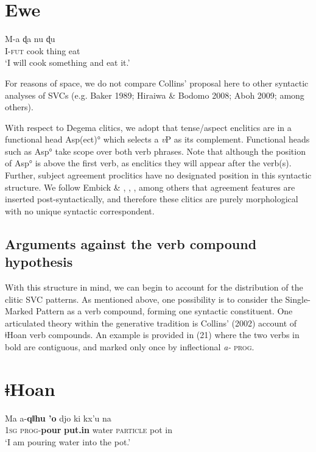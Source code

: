 \chapter[Ewe]{Ewe}
\label{bkm:Ref375319560}\gll M-a  ɖa    nu    ɖu\\
     I-\textsc{fut}  cook  thing  eat\\
\glt ‘I will cook something and eat it.’ \citep[490-491]{Collins1997}
\z

For reasons of space, we do not compare Collins’ proposal here to other syntactic analyses of SVCs (e.g. Baker 1989; Hiraiwa \& Bodomo 2008; Aboh 2009; among others). 

With respect to Degema clitics, we adopt that tense/aspect enclitics are in a functional head Asp(ect)° which selects a \textit{v}P as its complement. Functional heads such as Asp° take scope over both verb phrases. Note that although the position of Asp° is above the first verb, as enclitics they will appear after the verb(s). Further, subject agreement proclitics have no designated position in this syntactic structure. We follow Embick \& \citet{Noyer2007}, \citet{Kramer2010}, \citet{Norris2014}, among others that agreement features are inserted post-syntactically, and therefore these clitics are purely morphological with no unique syntactic correspondent. 

\section{Arguments against the verb compound hypothesis}
\label{bkm:Ref449523633}
With this structure in mind, we can begin to account for the distribution of the clitic SVC patterns. As mentioned above, one possibility is to consider the Single-Marked Pattern as a verb compound, forming one syntactic constituent. One articulated theory within the generative tradition is Collins’ (2002) account of ǂHoan verb compounds. An example is provided in (21) where the two verbs in bold are contiguous, and marked only once by inflectional \textit{a- }\textsc{prog}.

\chapter[ǂHoan]{ǂHoan}
\label{bkm:Ref449455636}\gll Ma  a-\textbf{qǁhu    {\textbar}’o}    djo    ki      kx’u    na\\
     \textsc{1sg}   \textsc{prog}{}-\textbf{pour}  \textbf{put.in}  water  \textsc{particle}  pot    in\\
\glt ‘I am pouring water into the pot.’ \citep[1]{Collins2002}
\z


